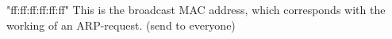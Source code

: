 "ff:ff:ff:ff:ff:ff" This is the broadcast MAC address, which corresponds with the working of an ARP-request. (send to everyone)